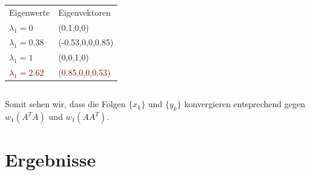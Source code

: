 \documentclass[hyperref={pdfpagelabels=false}]{beamer}
\begin{document}
\begin{frame}
\begin{minipage}[0.2\textheight]{\textwidth}
\begin{columns}[T]
\begin{column}{0.4\textwidth}
		\begin{tabular}{l l}
			Eigenwerte & Eigenvektoren \\
			$\lambda_1 = 0$ & (0,1,0,0) \\ 
			$\lambda_1 = 0.38$ & (-0.53,0,0,0.85)\\
			$\lambda_1 = 1$ & (0,0,1,0) \\
			\textcolor{maroon}{$\lambda_1 = 2.62$} & \textcolor{maroon}{(0.85,0,0,0.53)} \\
		\end{tabular}
	\end{column}
	\end{columns}
\end{minipage}

Somit sehen wir, dass die Folgen $\{x_k\}$ und $\{y_k\}$ konvergieren entsprechend gegen $w_1(A^TA)$ und $w_1(AA^T)$.

\end{frame}
\section{Ergebnisse} 
\end{document}
